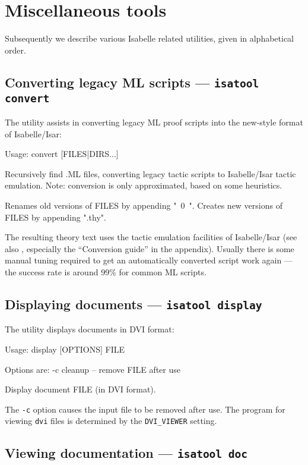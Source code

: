 

\chapter{Miscellaneous tools} \label{ch:tools}

Subsequently we describe various Isabelle related utilities, given in
alphabetical order.


\section{Converting legacy ML scripts --- \texttt{isatool convert}}

The  utility assists in converting legacy ML proof scripts
into the new-style format of Isabelle/Isar:
\begin{ttbox}
Usage: convert [FILES|DIRS...]

  Recursively find .ML files, converting legacy tactic scripts to
  Isabelle/Isar tactic emulation.
  Note: conversion is only approximated, based on some heuristics.

  Renames old versions of FILES by appending "~0~".
  Creates new versions of FILES by appending ".thy".
\end{ttbox}
The resulting theory text uses the tactic emulation facilities of
Isabelle/Isar (see also \cite{isabelle-ref}, especially the ``Conversion
guide'' in the appendix).  Usually there is some manual tuning required to get
an automatically converted script work again --- the success rate is around
99\% for common ML scripts.


\section{Displaying documents --- \texttt{isatool display}}

The  utility displays documents in DVI format:
\begin{ttbox}
Usage: display [OPTIONS] FILE

  Options are:
    -c           cleanup -- remove FILE after use

  Display document FILE (in DVI format).
\end{ttbox}

The \texttt{-c} option causes the input file to be removed after use.  The
program for viewing \texttt{dvi} files is determined by the
\texttt{DVI_VIEWER} setting.


\section{Viewing documentation --- \texttt{isatool doc}} \label{sec:tool-doc}

